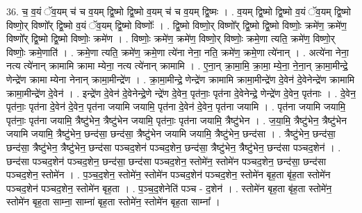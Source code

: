 \documentclass[17pt]{extarticle}
\begin{document}
36. च॒ व॒यं ॅव॒यम् च॑ च व॒यम् द्वि॒ष्मो द्वि॒ष्मो व॒यम् च॑ च व॒यम् द्वि॒ष्मः । . व॒यम् द्वि॒ष्मो द्वि॒ष्मो व॒यं ॅव॒यम् द्वि॒ष्मो विष्णो॒र् विष्णो᳚र् द्वि॒ष्मो व॒यं ॅव॒यम् द्वि॒ष्मो विष्णोः᳚ । . द्वि॒ष्मो विष्णो॒र् विष्णो᳚र् द्वि॒ष्मो द्वि॒ष्मो विष्णोः॒ क्रमे॑ण॒ क्रमे॑ण॒ विष्णो᳚र् द्वि॒ष्मो द्वि॒ष्मो विष्णोः॒ क्रमे॑ण । . विष्णोः॒ क्रमे॑ण॒ क्रमे॑ण॒ विष्णो॒र् विष्णोः॒ क्रमे॒णा त्यति॒ क्रमे॑ण॒ विष्णो॒र् विष्णोः॒ क्रमे॒णाति॑ । . क्रमे॒णा त्यति॒ क्रमे॑ण॒ क्रमे॒णा त्ये॑ना नेना॒ नति॒ क्रमे॑ण॒ क्रमे॒णा त्ये॑नान् । . अत्ये॑ना नेना॒ नत्य त्ये॑नान् क्रामामि क्रामा म्येना॒ नत्य त्ये॑नान् क्रामामि । . ए॒ना॒न् क्रा॒मा॒मि॒ क्रा॒मा॒ म्ये॒ना॒ ने॒ना॒न् क्रा॒मा॒मीन्द्रे॒ णेन्द्रे॑ण क्रामा म्येना नेनान् क्रामा॒मीन्द्रे॑ण । . क्रा॒मा॒मीन्द्रे॒ णेन्द्रे॑ण क्रामामि क्रामा॒मीन्द्रे॑ण दे॒वेन॑ दे॒वेनेन्द्रे॑ण क्रामामि क्रामा॒मीन्द्रे॑ण दे॒वेन॑ । . इन्द्रे॑ण दे॒वेन॑ दे॒वेनेन्द्रे॒णे न्द्रे॑ण दे॒वेन॒ पृत॑नाः॒ पृत॑ना दे॒वेनेन्द्रे॒ णेन्द्रे॑ण दे॒वेन॒ पृत॑नाः । . दे॒वेन॒ पृत॑नाः॒ पृत॑ना दे॒वेन॑ दे॒वेन॒ पृत॑ना जयामि जयामि॒ पृत॑ना दे॒वेन॑ दे॒वेन॒ पृत॑ना जयामि । . पृत॑ना जयामि जयामि॒ पृत॑नाः॒ पृत॑ना जयामि॒ त्रैष्टु॑भेन॒ त्रैष्टु॑भेन जयामि॒ पृत॑नाः॒ पृत॑ना जयामि॒ त्रैष्टु॑भेन । . ज॒या॒मि॒ त्रैष्टु॑भेन॒ त्रैष्टु॑भेन जयामि जयामि॒ त्रैष्टु॑भेन॒ छन्द॑सा॒ छन्द॑सा॒ त्रैष्टु॑भेन जयामि जयामि॒ त्रैष्टु॑भेन॒ छन्द॑सा । . त्रैष्टु॑भेन॒ छन्द॑सा॒ छन्द॑सा॒ त्रैष्टु॑भेन॒ त्रैष्टु॑भेन॒ छन्द॑सा पञ्चद॒शेन॑ पञ्चद॒शेन॒ छन्द॑सा॒ त्रैष्टु॑भेन॒ त्रैष्टु॑भेन॒ छन्द॑सा पञ्चद॒शेन॑ । . छन्द॑सा पञ्चद॒शेन॑ पञ्चद॒शेन॒ छन्द॑सा॒ छन्द॑सा पञ्चद॒शेन॒ स्तोमे॑न॒ स्तोमे॑न पञ्चद॒शेन॒ छन्द॑सा॒ छन्द॑सा पञ्चद॒शेन॒ स्तोमे॑न । . प॒ञ्च॒द॒शेन॒ स्तोमे॑न॒ स्तोमे॑न पञ्चद॒शेन॑ पञ्चद॒शेन॒ स्तोमे॑न बृह॒ता बृ॑ह॒ता स्तोमे॑न पञ्चद॒शेन॑ पञ्चद॒शेन॒ स्तोमे॑न बृह॒ता । . प॒ञ्च॒द॒शेनेति॑ पञ्च - द॒शेन॑ । . स्तोमे॑न बृह॒ता बृ॑ह॒ता स्तोमे॑न॒ स्तोमे॑न बृह॒ता साम्ना॒ साम्ना॑ बृह॒ता स्तोमे॑न॒ स्तोमे॑न बृह॒ता साम्ना᳚ । \newline
\end{document}
